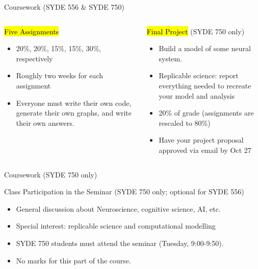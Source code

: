 \documentclass[aspectratio=169]{beamer}
\begin{document}
\begin{frame}{Coursework (SYDE 556 \& SYDE 750)}
	\begin{columns}[t]
		\begin{block}{\hl{Five Assignments}}
		\begin{itemize}
				\item 20\%, 20\%, 15\%, 15\%, 30\%, respectively
				\item Roughly two weeks for each assignment
				\item Everyone must write their own code, generate their own graphs, and write their own answers.
			\end{itemize}
		\end{block}
		\begin{block}{\hl{Final Project} (SYDE 750 only)}
			\begin{itemize}
				\item Build a model of some neural system.
				\item Replicable science: report everything needed to recreate your model and analysis
				\item 20\% of grade (assignments are rescaled to 80\%)
				\item Have your project proposal approved via email by Oct 27
			\end{itemize}
		\end{block}
	\end{columns}
\end{frame}

\begin{frame}{Coursework (SYDE 750 only)}
	\begin{block}{Class Participation in the Seminar  (SYDE 750 only; optional for SYDE 556)}
	\begin{itemize}
		\item General discussion about Neuroscience, cognitive science, AI, etc.
		\item Special interest: replicable science and computational modelling
		\item SYDE 750 students must attend the seminar (Tuesday, 9:00-9:50).
		\item No marks for this part of the course.
	\end{itemize}
	\end{block}
\end{frame}
\end{document}

